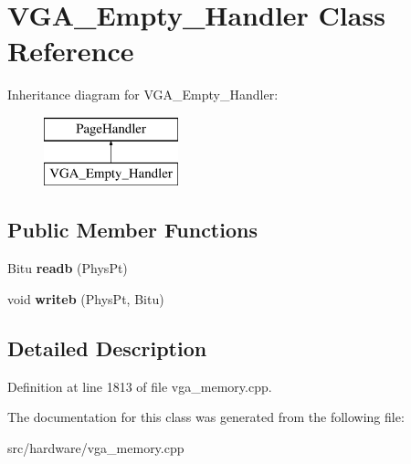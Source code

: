 \hypertarget{classVGA__Empty__Handler}{\section{V\-G\-A\-\_\-\-Empty\-\_\-\-Handler Class Reference}
\label{classVGA__Empty__Handler}
}
Inheritance diagram for V\-G\-A\-\_\-\-Empty\-\_\-\-Handler\-:\begin{figure}[H]
\begin{center}
\leavevmode
\includegraphics[height=2.000000cm]{classVGA__Empty__Handler}
\end{center}
\end{figure}
\subsection*{Public Member Functions}
\begin{DoxyCompactItemize}
\item 
\hypertarget{classVGA__Empty__Handler_ae84a276c3421d6db0f08b48d81692905}{Bitu {\bfseries readb} (Phys\-Pt)}\label{classVGA__Empty__Handler_ae84a276c3421d6db0f08b48d81692905}

\item 
\hypertarget{classVGA__Empty__Handler_a291f19e5b04518175d51cb6089424004}{void {\bfseries writeb} (Phys\-Pt, Bitu)}\label{classVGA__Empty__Handler_a291f19e5b04518175d51cb6089424004}

\end{DoxyCompactItemize}


\subsection{Detailed Description}


Definition at line 1813 of file vga\-\_\-memory.\-cpp.



The documentation for this class was generated from the following file\-:\begin{DoxyCompactItemize}
\item 
src/hardware/vga\-\_\-memory.\-cpp\end{DoxyCompactItemize}
